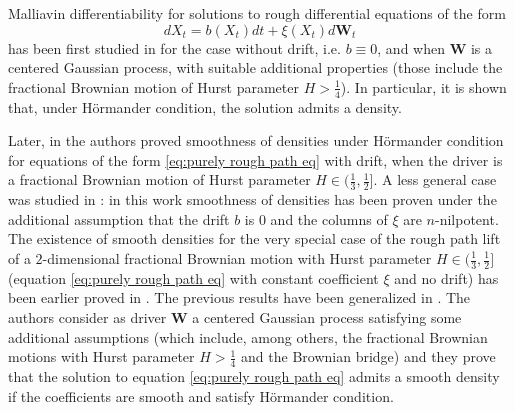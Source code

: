 \documentclass[11pt,a4paper]{article}
\theoremstyle{plain}
\begin{document}
Malliavin differentiability for solutions to rough differential equations of the form
\begin{equation} \label{eq:purely rough path eq}
dX_t = b(X_t) dt + \xi(X_t) d\mathbf{W}_t
\end{equation}
has been first studied in \cite{cass2010densities} for the case without drift, i.e. $b\equiv 0$, and when $\textbf{W}$ is a centered Gaussian process, with suitable additional properties (those include the fractional Brownian motion of Hurst parameter $H>\frac{1}{4}$). In particular, it is shown that, under Hörmander condition, the solution admits a density.

Later, in \cite{hairer2013regularity} the authors proved smoothness of densities under Hörmander condition for equations of the form \eqref{eq:purely rough path eq} with drift, when the driver is a fractional Brownian motion of Hurst parameter $H\in (\frac{1}{3},\frac{1}{2}]$. A less general case was studied in \cite{hu2013smooth}: in this work smoothness of densities has been proven under the additional assumption that the drift $b$ is $0$ and the columns of $\xi$ are $n$-nilpotent. The existence of smooth densities for the very special case of the rough path lift of a $2$-dimensional fractional Brownian motion with Hurst parameter $H\in (\frac{1}{3},\frac{1}{2}]$ (equation \eqref{eq:purely rough path eq} with constant coefficient $\xi$ and no drift) has been earlier proved in \cite{driscoll2010smoothness}.
The previous results have been generalized in \cite{cass2015smoothness}. The authors consider as driver $\mathbf{W}$ a centered Gaussian process satisfying some additional assumptions (which include, among others, the fractional Brownian motions with Hurst parameter $H>\frac{1}{4}$ and the Brownian bridge) and they prove that the solution to equation \eqref{eq:purely rough path eq} admits a smooth density if the coefficients are smooth and satisfy Hörmander condition.
\end{document}
